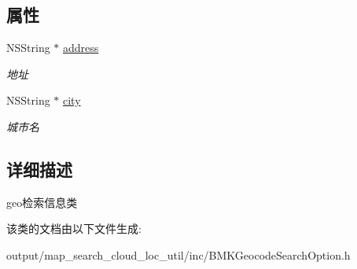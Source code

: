 \subsection*{属性}
\begin{DoxyCompactItemize}
\item 
\hypertarget{interface_b_m_k_geo_code_search_option_a8d27ba1022cbb8b24e0e4f7ab7ec8a46}{N\+S\+String $\ast$ \hyperlink{interface_b_m_k_geo_code_search_option_a8d27ba1022cbb8b24e0e4f7ab7ec8a46}{address}}\label{interface_b_m_k_geo_code_search_option_a8d27ba1022cbb8b24e0e4f7ab7ec8a46}

\begin{DoxyCompactList}\small\item\em 地址 \end{DoxyCompactList}\item 
\hypertarget{interface_b_m_k_geo_code_search_option_ad16f0f623de2a8a74114fb72b2844003}{N\+S\+String $\ast$ \hyperlink{interface_b_m_k_geo_code_search_option_ad16f0f623de2a8a74114fb72b2844003}{city}}\label{interface_b_m_k_geo_code_search_option_ad16f0f623de2a8a74114fb72b2844003}

\begin{DoxyCompactList}\small\item\em 城市名 \end{DoxyCompactList}\end{DoxyCompactItemize}


\subsection{详细描述}
geo检索信息类 

该类的文档由以下文件生成\+:\begin{DoxyCompactItemize}
\item 
output/map\+\_\+search\+\_\+cloud\+\_\+loc\+\_\+util/inc/B\+M\+K\+Geocode\+Search\+Option.\+h\end{DoxyCompactItemize}
